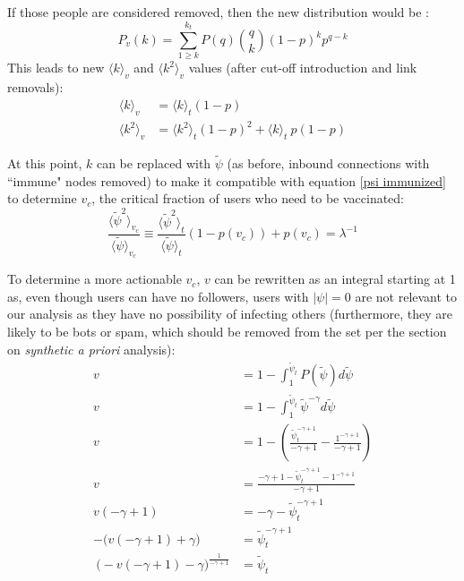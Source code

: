 \documentclass[preprint,review,12pt]{elsarticle}
\begin{document}
If those people are considered removed, then the new distribution would be \citep{cohen2001breakdown}:
\begin{equation}
    P_v(k) = \sum_{1\geq k}^{k_t}P(q)\binom{q}{k}(1-p)^kp^{q-k}
\end{equation}
This leads to new $\langle k \rangle_v$ and $\langle k^2 \rangle_v$ values (after cut-off introduction and link removals)\citep{pastor2002immunization}: 
\begin{align*}
        \langle k \rangle_v &= \langle k \rangle_t(1-p)\\
         \langle k^2 \rangle_v &= \langle k^2 \rangle_t(1-p)^2+\langle k \rangle_t\ p(1-p)
\end{align*}

At this point, $k$ can be replaced with $\tilde{\psi}$ (as before, inbound connections with ``immune" nodes removed) to make it compatible with equation \ref{psi immunized} to determine $v_c$, the critical fraction of users who need to be vaccinated:
\begin{equation}
\label{v_c equation}
 \frac{\langle \tilde{\psi}^2 \rangle_{v_c}}{\langle \tilde{\psi} \rangle_{v_c}} \equiv \frac{\langle \tilde{\psi}^2 \rangle_{t}}{\langle \tilde{\psi} \rangle_{t}}(1-p(v_c))+p(v_c)=\lambda^{-1}
\end{equation}

To determine a more actionable $v_c$, $v$ can be rewritten as an integral starting at 1 as, even though users can have no followers, users with $|\psi| = 0$ are not relevant to our analysis as they have no possibility of infecting others (furthermore, they are likely to be bots or spam, which should be removed from the set per the section on \textit{synthetic a priori} analysis):
\begin{equation}
\begin{split}
    v & = 1 - \int_1^{\tilde{\psi}_{t}} P(\tilde{\psi})d\tilde{\psi} \\
   v & = 1 - \int_1^{\tilde{\psi}_{t}} \tilde{\psi}^{-\gamma}d\tilde{\psi} \\
   v & = 1 - \left(\frac{\tilde{\psi}_{t}^{-\gamma +1}}{-\gamma+1}-\frac{1^{-\gamma +1}}{-\gamma+1}\right) \\
   v & = \frac{-\gamma+1 - \tilde{\psi}_{t}^{-\gamma +1} -  1^{-\gamma +1}}{-\gamma+1} \\
   v(-\gamma + 1) & = -\gamma - \tilde{\psi}_{t}^{-\gamma +1}\\
   -\big(v(-\gamma + 1) + \gamma\big) & = \tilde{\psi}_{t}^{-\gamma+1}\\\
   \big(-v(-\gamma + 1) - \gamma\big)^{\frac{1}{-\gamma + 1}} & = \tilde{\psi}_t
\end{split}
\end{equation}
\end{document}
